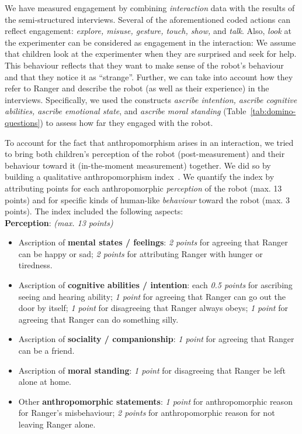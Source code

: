 \documentclass{sig-alternate}
\begin{document}
We have measured engagement by combining \emph{interaction}
data with the results of the semi-structured interviews.  Several of the
aforementioned coded actions can reflect engagement: \textit{explore, misuse,
gesture, touch, show,} and \textit{talk}. Also, \textit{look} at the
experimenter can be considered as engagement in the interaction: We assume that
children look at the experimenter when they are surprised and seek for help.
This behaviour reflects that they want to make sense of the robot's behaviour and
that they notice it as ``strange''. Further, we can take into account how they
refer to Ranger and describe the robot (as well as their experience) in the
interviews.  Specifically, we used the constructs \textit{ascribe intention,
ascribe cognitive abilities, ascribe emotional state}, and \textit{ascribe
moral standing} (Table~\ref{tab:domino-questions}) to assess how far they
engaged with the robot.

To account for the fact that anthropomorphism arises in an interaction, we tried
to bring both children's perception of the robot (post-measurement) and their
behaviour toward it (in-the-moment measurement) together. We did so by building
a qualitative anthropomorphism index~\cite{fink2014dynamics}. We quantify the
index by attributing points for each anthropomorphic \emph{perception} of the
robot (max.  13 points) and for specific kinds of human-like \emph{behaviour}
toward the robot (max.  3 points). The index included the following aspects:\\

\textbf{Perception}: \textit{(max. 13 points)}

\begin{itemize}
    \item Ascription of \textbf{mental states / feelings}: \textit{2 points} for agreeing
            that Ranger can be happy or sad; \textit{2 points} for attributing Ranger with
        hunger or tiredness.

    \item Ascription of \textbf{cognitive abilities / intention}: each \textit{0.5
        points} for ascribing seeing and hearing ability; \textit{1 point} for agreeing
            that Ranger can go out the door by itself; \textit{1 point} for disagreeing that
            Ranger always obeys; \textit{1 point} for agreeing that Ranger can do something
        silly.

    \item Ascription of \textbf{sociality / companionship}: \textit{1 point} for agreeing
        that Ranger can be a friend.

    \item Ascription of \textbf{moral standing}: \textit{1 point} for disagreeing that
        Ranger be left alone at home.

    \item Other \textbf{anthropomorphic statements}: \textit{1 point} for anthropomorphic
        reason for Ranger's misbehaviour; \textit{2 points} for anthropomorphic reason
        for not leaving Ranger alone.

\end{itemize}
\end{document}

